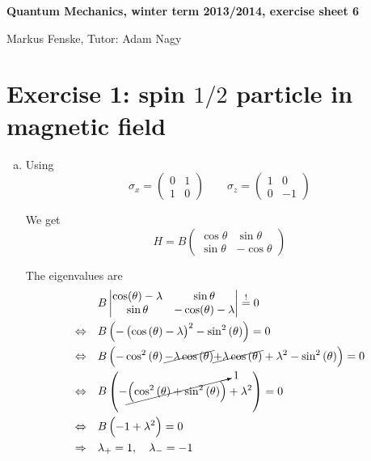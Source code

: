 \documentclass[a4paper,german,12pt,smallheadings]{scrartcl}
\begin{document}
\allowdisplaybreaks %
\begin{center}
\bfseries %
\sffamily %
\vspace{-40pt}
Quantum Mechanics, winter term 2013/2014, exercise sheet 6

Markus Fenske, Tutor: Adam Nagy
\vspace{-10pt}
\end{center}

\section*{Exercise 1: spin $1/2$ particle in magnetic field}
\begin{enumerate}[a)]
  \item
    Using
    \begin{equation*}
    \sigma_x = \begin{pmatrix}0 & 1 \\ 1 & 0\end{pmatrix} \qquad \sigma_z = \begin{pmatrix}1 & 0 \\ 0 & -1\end{pmatrix}
    \end{equation*}

    We get
    \begin{equation*}
    H = B \begin{pmatrix} \cos \theta & \sin \theta \\ \sin \theta & -\cos \theta \end{pmatrix}
    \end{equation*}

    The eigenvalues are
    \begin{align*}
    &B \begin{vmatrix} \cos(\theta) - \lambda & \sin \theta \\ \sin \theta & -\cos(\theta) - \lambda \end{vmatrix} \overset{!}{=} 0 \\
      \Leftrightarrow\quad&B \del{-\del{\cos\del{\theta} - \lambda}^2-\sin^2\del{\theta}}  = 0\\
      \Leftrightarrow\quad&B \del{-\cos^2\del\theta \cancel{-\lambda\cos\del\theta}\cancel{+\lambda\cos\del\theta}+\lambda^2-\sin^2\del\theta} = 0\\
      \Leftrightarrow\quad&B \del{-\cancelto{1}{\del{\cos^2\del\theta+\sin^2\del\theta}}+\lambda^2} = 0\\
      \Leftrightarrow\quad&B \del{-1+\lambda^2} = 0\\
      \Rightarrow\quad &\lambda_+ = 1,\quad \lambda_- = -1
    \end{align*}


\end{enumerate}
\end{document}
